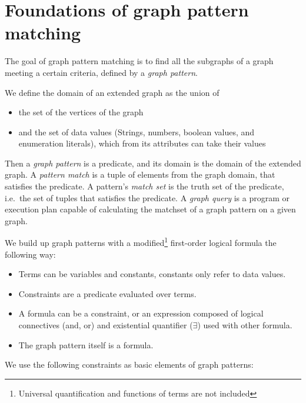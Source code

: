 \section{Foundations of graph pattern matching}
\label{section:gpmc}


The goal of graph pattern matching is to find all the subgraphs of a graph meeting a certain criteria, defined by a \emph{graph pattern}.

We define the domain of an extended graph as the union of 
\begin{itemize}
	\item the set of the vertices of the graph
	\item and the set of data values (Strings, numbers, boolean values, and enumeration literals), which from its attributes can take their values
\end{itemize}

Then a \emph{graph pattern} is a predicate, and its  domain is the domain of the extended graph.
A \emph{pattern match} is a tuple of elements from the graph domain, that satisfies the predicate.
A pattern's \emph{match set} is the truth set of the predicate, i.e.\ the set of tuples that satisfies the predicate.
A \emph{graph query} is a program or execution plan capable of calculating the matchset of a graph pattern on a given graph. 



We build up graph patterns with a modified\footnote{ Universal quantification and functions of terms are not included } first-order logical formula the following way:
\begin{itemize}
	\item Terms can be variables and constants, constants only refer to data values.
	\item Constraints are a predicate evaluated over terms. 
	\item A formula can be a constraint, or an expression composed of logical connectives (and, or) and existential quantifier ($\exists{}$) used with other formula.
	\item The graph pattern itself is a formula.
\end{itemize}

We use the following constraints as basic elements of graph patterns:

